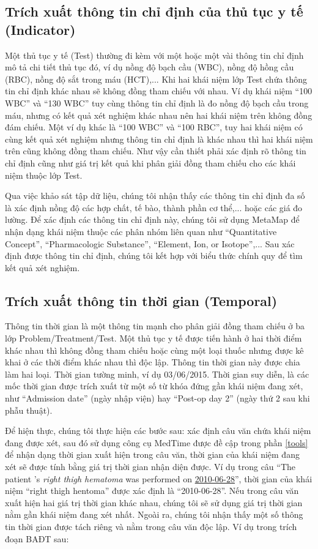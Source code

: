\subsection*{Trích xuất thông tin chỉ định của thủ tục y tế (Indicator)}
Một thủ tục y tế (Test) thường đi kèm với một hoặc một vài thông tin chỉ định mô tả chi tiết thủ tục đó, ví dụ nồng độ bạch cầu (WBC), nồng độ hồng cầu (RBC), nồng độ sắt trong máu (HCT),... Khi hai khái niệm lớp Test chứa thông tin chỉ định khác nhau sẽ không đồng tham chiếu với nhau. Ví dụ khái niệm ``100 WBC'' và ``130 WBC'' tuy cùng thông tin chỉ định là đo nồng độ bạch cầu trong máu, nhưng có kết quả xét nghiệm khác nhau nên hai khái niệm trên không đồng đám chiếu. Một ví dụ khác là ``100 WBC'' và ``100 RBC'', tuy hai khái niệm có cùng kết quả xét nghiệm nhưng thông tin chỉ định là khác nhau thì hai khái niệm trên cũng không đồng tham chiếu. Như vậy cần thiết phải xác định rõ thông tin chỉ định cũng như giá trị kết quả khi phân giải đồng tham chiếu cho các khái niệm thuộc lớp Test.

Qua việc khảo sát tập dữ liệu, chúng tôi nhận thấy các thông tin chỉ định đa số là xác định nồng độ các hợp chất, tế bào, thành phần cơ thể,... hoặc các giá đo lường. Để xác định các thông tin chỉ định này, chúng tôi sử dụng MetaMap để nhận dạng khái niệm thuộc các phân nhóm liên quan như ``Quantitative Concept'', ``Pharmacologic Substance'', ``Element, Ion, or Isotope'',... Sau xác định được thông tin chỉ định, chúng tôi kết hợp với biểu thức chính quy để tìm kết quả xét nghiệm.

\subsection*{Trích xuất thông tin thời gian (Temporal)}
Thông tin thời gian là một thông tin mạnh cho phân giải đồng tham chiếu ở ba lớp Problem/Treatment/Test. Một thủ tục y tế được tiến hành ở hai thời điểm khác nhau thì không đồng tham chiếu hoặc cùng một loại thuốc nhưng được kê khai ở các thời điểm khác nhau thì độc lập. Thông tin thời gian này được chia làm hai loại. Thời gian tường minh, ví dụ 03/06/2015. Thời gian suy diễn, là các mốc thời gian được trích xuất từ một số từ khóa đứng gần khái niệm đang xét, như ``Admission date'' (ngày nhập viện) hay ``Post-op day 2'' (ngày thứ 2 sau khi phẫu thuật).

Để hiện thực, chúng tôi thực hiện các bước sau: xác định câu văn chứa khái niệm đang được xét, sau đó sử dụng công cụ MedTime được đề cập trong phần \ref{tools} để nhận dạng thời gian xuất hiện trong câu văn, thời gian của khái niệm đang xét sẽ được tính bằng giá trị thời gian nhận diện được. Ví dụ trong câu ``The patient 's \textit{right thigh hematoma} was performed on \underline{2010-06-28}'', thời gian của khái niệm ``right thigh hentoma'' được xác định là ``2010-06-28''. Nếu trong câu văn xuất hiện hai giá trị thời gian khác nhau, chúng tôi sẽ sử dụng giá trị thời gian nằm gần khái niệm đang xét nhất. Ngoài ra, chúng tôi nhận thấy một số thông tin thời gian được tách riêng và nằm trong câu văn độc lập. Ví dụ trong trích đoạn BAĐT sau:

